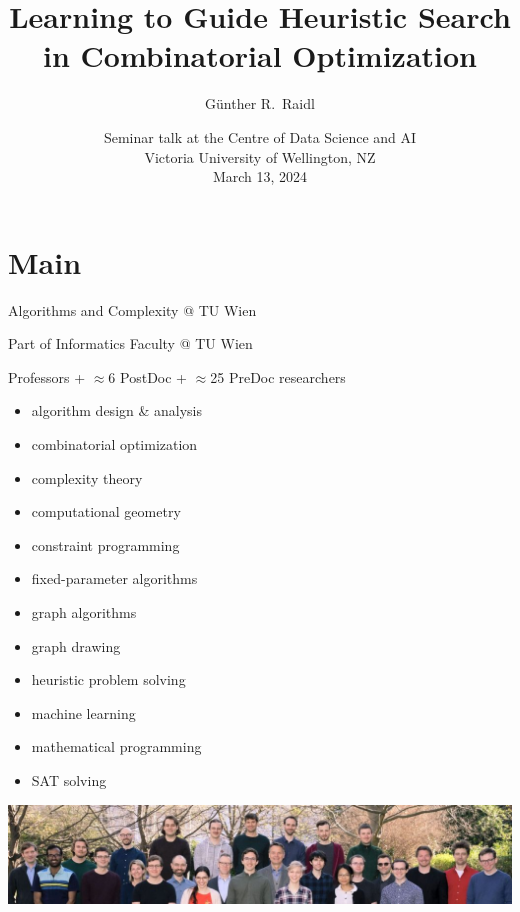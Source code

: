 \documentclass[aspectratio=1610]{beamer}
\title{Learning to Guide Heuristic Search in Combinatorial Optimization}
\author{Günther R.\ Raidl}
\date{Seminar talk at the Centre of Data Science and AI\\ Victoria University of Wellington, NZ\\March 13, 2024}
\institute[]{Algorithms and Complexity , TU Wien, Austria,\\
    raidl@ac.tuwien.ac.at\\[1ex]
}
\begin{document}
{}


\part{Main}

\begin{frame}
  \titlepage
\end{frame} 


\begin{frame}{Algorithms and Complexity  @ TU Wien}

Part of Informatics Faculty @ TU Wien

 Professors + $\approx$6 PostDoc + $\approx$25 PreDoc researchers 

\medskip
{}

\medskip 
\begin{minipage}{0.4\textwidth}
  \begin{itemize}
      \item algorithm design \& analysis
      \item combinatorial optimization
      \item complexity theory
      \item computational geometry
      \item constraint programming
      \item fixed-parameter algorithms
  \end{itemize}
\end{minipage}\qquad
\begin{minipage}{0.4\textwidth}
  \begin{itemize}
      \item graph algorithms
      \item graph drawing
      \item heuristic problem solving
      \item machine learning
      \item mathematical programming
      \item SAT solving
    \end{itemize}
  \end{minipage}

  \bigskip
  \includegraphics[width=\textwidth]{figures/group.jpg}
\end{frame}
\end{document}
